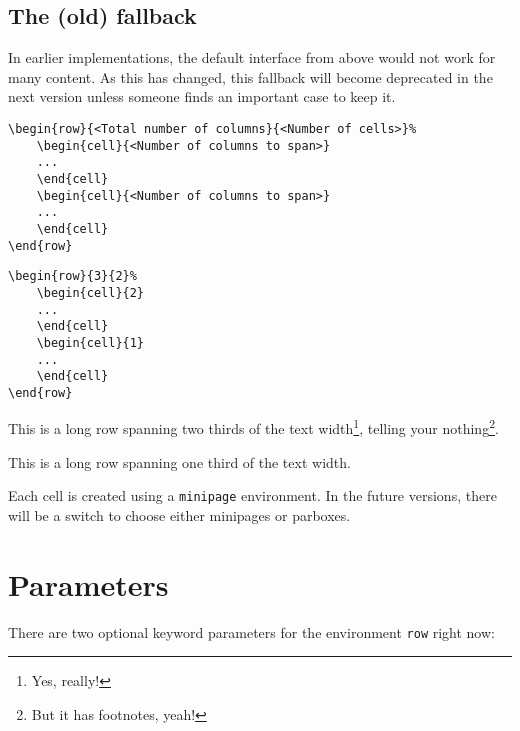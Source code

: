 \documentclass[DIV13]{scrartcl}
\begin{document}
\clearpage

\subsection{The (old) fallback}
In earlier implementations, the default interface from above would not work for many content. As this has changed, this fallback will become deprecated in the next version unless someone finds an important case to keep it.

\begin{lstlisting}
\begin{row}{<Total number of columns}{<Number of cells>}%
	\begin{cell}{<Number of columns to span>}
	...
	\end{cell}
	\begin{cell}{<Number of columns to span>}
	...
	\end{cell}
\end{row}
\end{lstlisting}

\begin{lstlisting}
\begin{row}{3}{2}%
	\begin{cell}{2}
	...
	\end{cell}
	\begin{cell}{1}
	...
	\end{cell}
\end{row}
\end{lstlisting}

\begin{row}{3}{2}%
	\begin{cell}{2}
	This is a long row spanning two thirds of the text width\footnote{Yes, really!}, telling your nothing\footnote{But it has footnotes, yeah!}.
	\end{cell}
	\begin{cell}{1}
	This is a long row spanning one third of the text width.
	\end{cell}
\end{row}

\bigskip

Each cell is created using a \texttt{minipage} environment. In the future versions, there will be a switch to choose either minipages or parboxes.

\section{Parameters}
There are two optional keyword parameters for the environment \texttt{row} right now:
\end{document}
